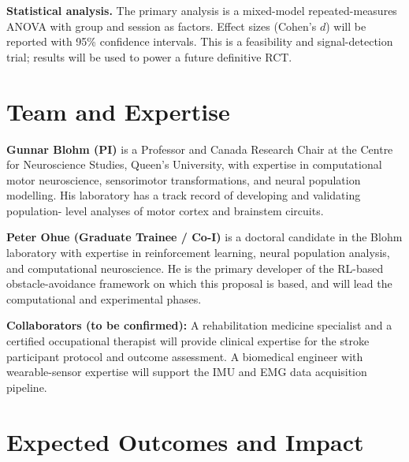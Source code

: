 \documentclass[12pt]{article}
\begin{document}
\textbf{Statistical analysis.}
The primary analysis is a mixed-model repeated-measures ANOVA with
group and session as factors.
Effect sizes (Cohen's $d$) will be reported with 95\% confidence intervals.
This is a feasibility and signal-detection trial; results will be used to
power a future definitive RCT.

\section{Team and Expertise}

\textbf{Gunnar Blohm (PI)} is a Professor and Canada Research Chair at
the Centre for Neuroscience Studies, Queen's University, with expertise
in computational motor neuroscience, sensorimotor transformations, and
neural population modelling.
His laboratory has a track record of developing and validating population-
level analyses of motor cortex and brainstem circuits.

\textbf{Peter Ohue (Graduate Trainee / Co-I)} is a doctoral candidate in the
Blohm laboratory with expertise in reinforcement learning, neural population
analysis, and computational neuroscience.
He is the primary developer of the RL-based obstacle-avoidance framework
on which this proposal is based, and will lead the computational and
experimental phases.

\textbf{Collaborators (to be confirmed):}
A rehabilitation medicine specialist and a certified occupational therapist
will provide clinical expertise for the stroke participant protocol and
outcome assessment.
A biomedical engineer with wearable-sensor expertise will support the IMU
and EMG data acquisition pipeline.

\section{Expected Outcomes and Impact}
\end{document}

